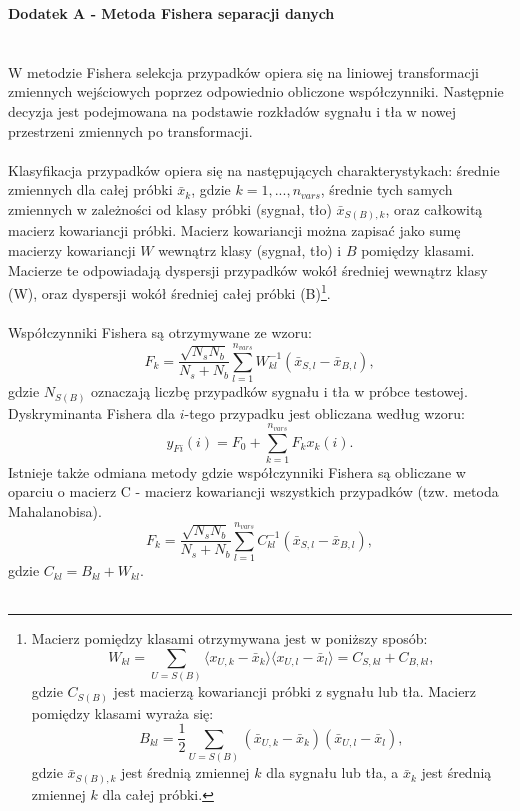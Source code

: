 \documentclass{pracamgr}
\begin{document}
\newpage
{}
\noindent
\huge{\textbf{Dodatek A - Metoda Fishera separacji danych}}
\normalsize
\\\\\\
\noindent
W metodzie Fishera selekcja przypadków opiera się na liniowej transformacji zmiennych wejściowych poprzez odpowiednio obliczone współczynniki. Następnie decyzja jest podejmowana na podstawie rozkładów sygnału i tła w nowej przestrzeni zmiennych po transformacji.
\\\\
\noindent
Klasyfikacja przypadków opiera się na następujących charakterystykach: średnie zmiennych dla całej próbki $\bar{x}_k$, gdzie $k=1,...,n_{vars}$, średnie tych samych zmiennych w zależności od klasy próbki (sygnał, tło) $\bar{x}_{S(B),k}$, oraz całkowitą macierz kowariancji próbki. Macierz kowariancji można zapisać jako sumę macierzy kowariancji $W$ wewnątrz klasy (sygnał, tło) i $B$ pomiędzy klasami. Macierze te odpowiadają dyspersji przypadków wokół średniej wewnątrz klasy (W), oraz dyspersji wokół średniej całej próbki (B)\footnote{
\noindent
Macierz pomiędzy klasami otrzymywana jest w poniższy sposób:
\[
 W_{kl}=\sum_{U=S(B)}\langle x_{U,k}-\bar{x}_k\rangle \langle x_{U,l}-\bar{x}_l\rangle = C_{S,kl} + C_{B,kl},
\]
gdzie $C_{S(B)}$ jest macierzą kowariancji próbki z sygnału lub tła. Macierz pomiędzy klasami wyraża się:
\[
 B_{kl}=\frac{1}{2}\sum_{U=S(B)}(\bar{x}_{U,k} - \bar{x}_{k})(\bar{x}_{U,l} - \bar{x}_{l}),
\]
gdzie $\bar{x}_{S(B),k}$ jest średnią zmiennej $k$ dla sygnału lub tła, a $\bar{x}_{k}$ jest średnią zmiennej $k$ dla całej próbki.
}.
\\\\
\noindent
Współczynniki Fishera są otrzymywane ze wzoru:
\[
 F_k=\frac{\sqrt{N_{s}N_{b}}}{N_s+N_b}\sum_{l=1}^{n_{vars}}W_{kl}^{-1}\left(\bar{x}_{S,l}-\bar{x}_{B,l}\right),
\]
\noindent
gdzie $N_{S(B)}$ oznaczają liczbę przypadków sygnału i tła w próbce testowej. Dyskryminanta Fishera dla $i$-tego przypadku jest obliczana według wzoru:
\[
 y_{Fi}(i) = F_0 + \sum_{k=1}^{n_{vars}} F_k x_k(i).
\]
\noindent
Istnieje także odmiana metody gdzie współczynniki Fishera są obliczane w oparciu o macierz C - macierz kowariancji wszystkich przypadków (tzw. metoda Mahalanobisa).
\[
 F_k=\frac{\sqrt{N_{s}N_{b}}}{N_s+N_b}\sum_{l=1}^{n_{vars}}C_{kl}^{-1}\left(\bar{x}_{S,l}-\bar{x}_{B,l}\right),
\]
\noindent
gdzie $C_{kl}=B_{kl} + W_{kl}$.
\\\\
\end{document}
